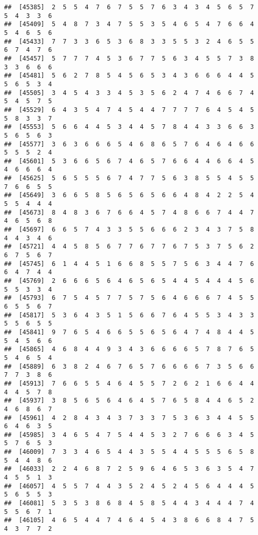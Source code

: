 \documentclass[
]{book}
\begin{document}
\begin{verbatim}
##  [45385]  2  5  5  4  7  6  7  5  5  7  6  3  4  3  4  5  6  5  7  5  4  3  3  6
##  [45409]  5  4  8  7  3  4  7  5  5  3  5  4  6  5  4  7  6  6  4  5  4  6  5  6
##  [45433]  7  7  3  3  6  5  3  6  8  3  3  5  5  3  2  4  6  5  5  6  7  4  7  6
##  [45457]  5  7  7  7  4  5  3  6  7  7  5  6  3  4  5  5  7  3  8  3  3  6  6  6
##  [45481]  5  6  2  7  8  5  4  5  6  5  3  4  3  6  6  6  4  4  5  5  6  5  3  4
##  [45505]  3  4  5  4  3  3  4  5  3  5  6  2  4  7  4  6  6  7  4  5  4  5  7  5
##  [45529]  6  4  3  5  4  7  4  5  4  4  7  7  7  7  6  4  5  4  5  5  8  3  3  7
##  [45553]  5  6  6  4  4  5  3  4  4  5  7  8  4  4  3  3  6  6  3  5  6  5  6  3
##  [45577]  3  6  3  6  6  6  5  4  6  8  6  5  7  6  4  6  4  6  6  5  5  5  2  4
##  [45601]  5  3  6  6  5  6  7  4  6  5  7  6  6  4  4  6  6  4  5  4  6  6  6  4
##  [45625]  5  6  5  5  5  6  7  4  7  7  5  6  3  8  5  5  4  5  5  7  6  6  5  5
##  [45649]  3  6  6  5  8  5  6  5  6  5  6  6  4  8  4  2  2  5  4  5  5  4  4  4
##  [45673]  8  4  8  3  6  7  6  6  4  5  7  4  8  6  6  7  4  4  7  4  6  5  6  8
##  [45697]  6  6  5  7  4  3  3  5  5  6  6  6  2  3  4  3  7  5  8  4  4  3  4  6
##  [45721]  4  4  5  8  5  6  7  7  6  7  7  6  7  5  3  7  5  6  2  6  7  5  6  7
##  [45745]  6  1  4  4  5  1  6  6  8  5  5  7  5  6  3  4  4  7  6  6  4  7  4  4
##  [45769]  2  6  6  6  5  6  4  6  5  6  5  4  4  5  4  4  4  5  6  5  5  3  3  4
##  [45793]  6  7  5  4  5  7  7  5  7  5  6  4  6  6  6  7  4  5  5  6  5  5  6  7
##  [45817]  5  3  6  4  3  5  1  5  6  6  7  6  4  5  5  3  4  3  3  5  5  6  5  5
##  [45841]  9  7  6  5  4  6  6  5  5  6  5  6  4  7  4  8  4  4  5  5  4  5  6  6
##  [45865]  4  6  8  4  4  9  3  4  3  6  6  6  6  5  7  8  7  6  5  5  4  6  5  4
##  [45889]  6  3  8  2  4  6  7  6  5  7  6  6  6  6  7  3  5  6  6  7  7  3  8  6
##  [45913]  7  6  6  5  5  4  6  4  5  5  7  2  6  2  1  6  6  4  4  4  4  5  7  8
##  [45937]  3  8  5  6  5  6  4  6  4  5  7  6  5  8  4  4  6  5  2  4  6  8  6  7
##  [45961]  4  2  8  4  3  4  3  7  3  3  7  5  3  6  3  4  4  5  5  6  4  6  3  5
##  [45985]  3  4  6  5  4  7  5  4  4  5  3  2  7  6  6  6  3  4  5  5  7  6  5  3
##  [46009]  7  3  3  4  6  5  4  4  3  5  5  4  4  5  5  5  6  5  8  5  4  4  8  6
##  [46033]  2  2  4  6  8  7  2  5  9  6  4  6  5  3  6  3  5  4  7  4  5  5  1  3
##  [46057]  4  5  5  7  4  4  3  5  2  4  5  2  4  5  6  4  4  4  5  5  6  5  5  3
##  [46081]  5  3  5  3  8  6  8  4  5  8  5  4  4  3  4  4  4  7  4  5  5  6  7  1
##  [46105]  4  6  5  4  4  7  4  6  4  5  4  3  8  6  6  8  4  7  5  4  3  7  7  2

\end{verbatim}
\end{document}
